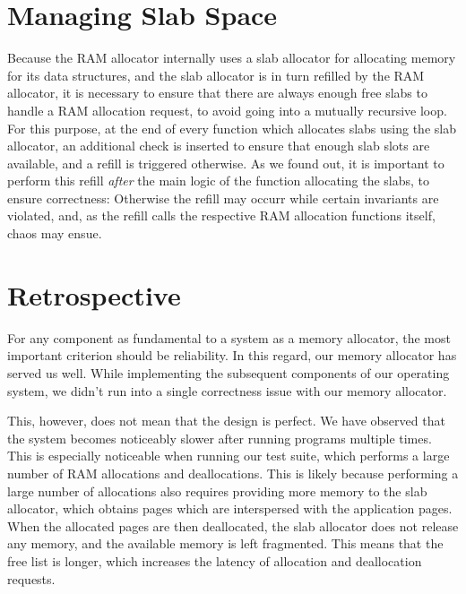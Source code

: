 \section{Managing Slab Space}
Because the RAM allocator internally uses a slab allocator for allocating memory for its data structures, and the slab allocator is in turn refilled by the RAM allocator, it is necessary to ensure that there are always enough free slabs to handle a RAM allocation request, to avoid going into a mutually recursive loop. For this purpose, at the end of every function which allocates slabs using the slab allocator, an additional check is inserted to ensure that enough slab slots are available, and a refill is triggered otherwise. As we found out, it is important to perform this refill \textit{after} the main logic of the function allocating the slabs, to ensure correctness: Otherwise the refill may occurr while certain invariants are violated, and, as the refill calls the respective RAM allocation functions itself, chaos may ensue.


\section{Retrospective}
For any component as fundamental to a system as a memory allocator, the most important criterion should be reliability. In this regard, our memory allocator has served us well.
While implementing the subsequent components of our operating system, we didn't run into a single correctness issue with our memory allocator.

This, however, does not mean that the design is perfect. We have observed that the system becomes noticeably slower after running programs multiple times. This is especially noticeable when running our test suite, which performs a large number of RAM allocations and deallocations. This is likely because performing a large number of allocations also requires providing more memory to the slab allocator, which obtains pages which are interspersed with the application pages. When the allocated pages are then deallocated, the slab allocator does not release any memory, and the available memory is left fragmented. This means that the free list is longer, which increases the latency of allocation and deallocation requests.

